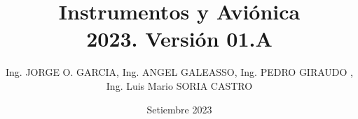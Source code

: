 \documentclass[a4page,12pt,twoside, spanish]{book}
\title{Instrumentos y Avi\'onica \\ 2023. Versi\'on 01.A}
\author{Ing. JORGE O. GARCIA, Ing. ANGEL GALEASSO, Ing. PEDRO GIRAUDO , Ing. Luis Mario SORIA CASTRO}
\date{Setiembre 2023}
\begin{document}
\renewcommand{\listtablename}{\'Indice de tablas} 
\renewcommand{\tablename}{Tabla}  %

\renewcommand{\appendixtocname}{Ap\'endices}
\renewcommand{\appendixpagename}{Ap\'endices}

\renewcommand{\baselinestretch}{1.5}       %

\setlength{\parindent}{0pt}      %

\clearpage
\thispagestyle{fancy}

\maketitle

\tableofcontents





















\clearpage	%
\printacronyms[name = Acr\'onimos, heading = chapter*]


\clearpage
\printglossaries	%

\clearpage


\clearpage
\renewcommand\bibname{Bibliograf\'ia} %



%


%
%

\begin{appendices}

%
%

\end{appendices}
\end{document}
